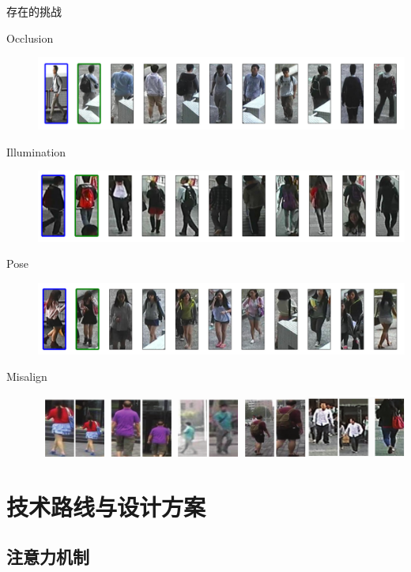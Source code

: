 \documentclass[notes]{beamer}
\begin{document}
\begin{frame}
	{存在的挑战}
	\begin{description}
		\item[Occlusion] \includegraphics[width=0.9\linewidth]{2018-03-12-10-09-03.png}
		\item[Illumination] \includegraphics[width=0.9\linewidth]{2018-03-12-10-10-10.png}
		\item[Pose] \includegraphics[width=0.9\linewidth]{2018-03-12-10-10-18.png}
		\item[Misalign] \includegraphics[width=0.88\linewidth]{2018-03-07-20-16-25.png}
	\end{description}

\end{frame}

\section{技术路线与设计方案}

\subsection{注意力机制}
\end{document}
